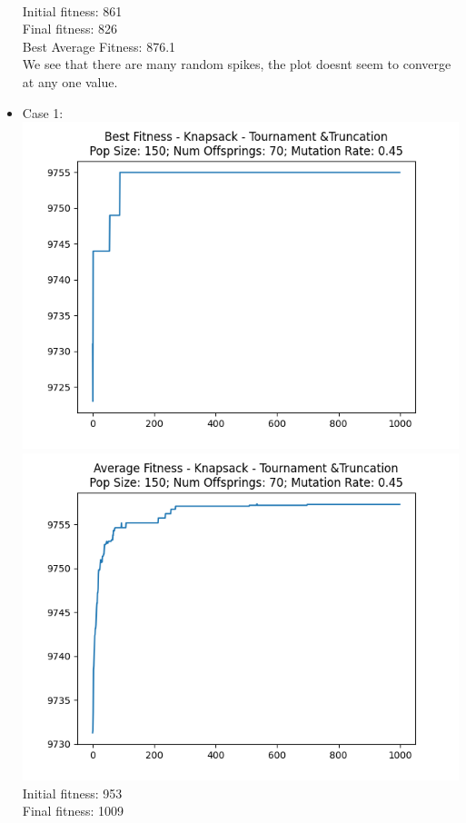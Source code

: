 \documentclass[12pt]{report} %
\begin{document}
\begin{itemize}
	      \\Initial fitness:  861
	      \\Final fitness:  826
	      \\Best Average Fitness: 876.1
	      \\We see that there are many random spikes, the plot doesnt seem to converge at any one value.
	      \\
	\item Case 1:\\
	      \includegraphics[scale=0.5]{../Analysis/BSF_Knapsack_2_3_150_70.png}
	      \includegraphics[scale=0.5]{../Analysis/ASF_Knapsack_2_3_150_70.png}
	      \\Initial fitness:  953
	      \\Final fitness:  1009

\end{itemize}
\end{document}
